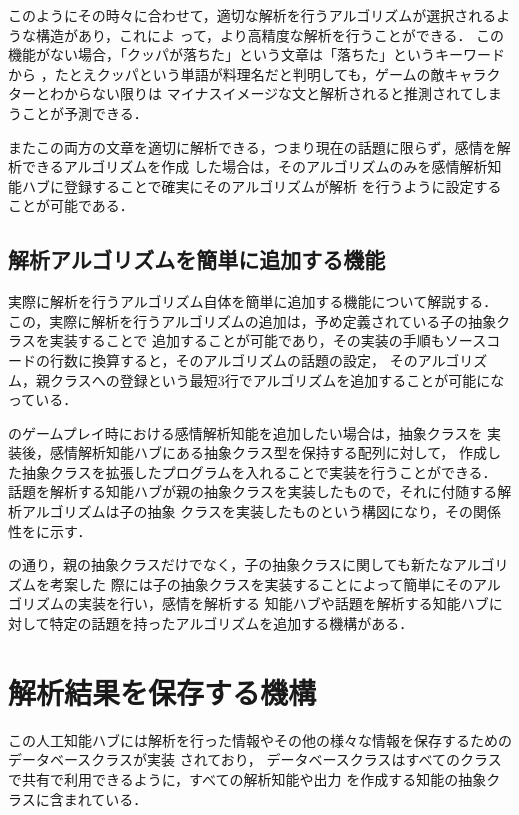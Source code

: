 
このようにその時々に合わせて，適切な解析を行うアルゴリズムが選択されるような構造があり，これによ
って，より高精度な解析を行うことができる．
この機能がない場合，「クッパが落ちた」という文章は「落ちた」というキーワードから
，たとえクッパという単語が料理名だと判明しても，ゲームの敵キャラクターとわからない限りは
マイナスイメージな文と解析されると推測されてしまうことが予測できる．

またこの両方の文章を適切に解析できる，つまり現在の話題に限らず，感情を解析できるアルゴリズムを作成
した場合は，そのアルゴリズムのみを感情解析知能ハブに登録することで確実にそのアルゴリズムが解析
を行うように設定することが可能である．
\newpage


\subsection{解析アルゴリズムを簡単に追加する機能}
実際に解析を行うアルゴリズム自体を簡単に追加する機能について解説する．
この，実際に解析を行うアルゴリズムの追加は，予め定義されている子の抽象クラスを実装することで
追加することが可能であり，その実装の手順もソースコードの行数に換算すると，そのアルゴリズムの話題の設定，
そのアルゴリズム，親クラスへの登録という最短3行でアルゴリズムを追加することが可能になっている．

のゲームプレイ時における感情解析知能を追加したい場合は，抽象クラスを
実装後，感情解析知能ハブにある抽象クラス型を保持する配列に対して，
作成した抽象クラスを拡張したプログラムを入れることで実装を行うことができる．
話題を解析する知能ハブが親の抽象クラスを実装したもので，それに付随する解析アルゴリズムは子の抽象
クラスを実装したものという構図になり，その関係性をに示す．


の通り，親の抽象クラスだけでなく，子の抽象クラスに関しても新たなアルゴリズムを考案した
際には子の抽象クラスを実装することによって簡単にそのアルゴリズムの実装を行い，感情を解析する
知能ハブや話題を解析する知能ハブに対して特定の話題を持ったアルゴリズムを追加する機構がある．

\newpage

\section{解析結果を保存する機構}
この人工知能ハブには解析を行った情報やその他の様々な情報を保存するためのデータベースクラスが実装
されており，
データベースクラスはすべてのクラスで共有で利用できるように，すべての解析知能や出力
を作成する知能の抽象クラスに含まれている．

